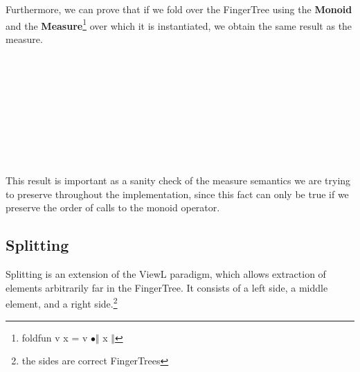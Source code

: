 \documentclass[12pt,twoside,notitlepage]{report}
\begin{document}
Furthermore, we can prove that if we fold over the FingerTree using the \textbf{Monoid} and the \textbf{Measure}\footnote{foldfun v x = v $∙ \Vert$ x $\Vert$} over which it is instantiated, we obtain the same result as the measure. 

\begin{code}
\\
\> \AgdaSymbol{:}  \AgdaSymbol{\{}\AgdaSymbol{\}} \AgdaSymbol{\{} \AgdaSymbol{:}  \AgdaSymbol{\}} \AgdaSymbol{\{} \AgdaSymbol{:}  \AgdaSymbol{\}}\<%
\\
\>[2]\<[14]%
\>[14]  \AgdaSymbol{:}   \<%
\\
\>[2]\<[14]%
\>[14]  \AgdaSymbol{:}    \<%
\\
\>[2]\<[14]%
\>[14] \AgdaSymbol{\{} \AgdaSymbol{:} \AgdaSymbol{\}}\<%
\\
\>[2]\<[14]%
\>[14] \AgdaSymbol{(} \AgdaSymbol{:} \AgdaSymbol{)}\<%
\\
\>[2]\<[14]%
\>[14] \AgdaSymbol{(} \AgdaSymbol{:}    \AgdaSymbol{\{}\AgdaSymbol{\})}\<%
\\
\>[2]\<[14]%
\>[14] \AgdaSymbol{(}       \AgdaSymbol{)}\<%
\\
\end{code}

This result is important as a sanity check of the measure semantics we are trying to preserve throughout the implementation, since this fact can only be true if we preserve the order of calls to the monoid operator.

\subsection{Splitting}

Splitting is an extension of the ViewL paradigm, which allows extraction of elements arbitrarily far in the FingerTree. It consists of a left side, a middle element, and a right side.\footnote{the sides are correct FingerTrees}
\end{document}
